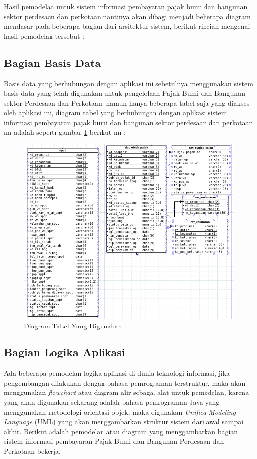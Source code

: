 \documentclass[pdftex,12pt, oneside]{article}
\begin{document}
Hasil pemodelan untuk sistem informasi pembayaran pajak bumi dan bangunan sektor perdesaan dan perkotaan nantinya akan dibagi menjadi beberapa diagram mendasar pada beberapa bagian dari arsitektur sistem, berikut rincian mengenai hasil pemodelan tersebut :

\subsection{Bagian Basis Data}

Basis data yang berhubungan dengan aplikasi ini sebetulnya menggunakan sistem basis data yang telah digunakan untuk pengelolaan Pajak Bumi dan Bangunan sektor Perdesaan dan Perkotaan, namun hanya beberapa tabel saja yang diakses oleh aplikasi ini, diagram tabel yang berhubungan dengan aplikasi sistem informasi pembayaran pajak bumi dan bangunan sektor perdesaan dan perkotaan ini adalah seperti gambar \ref{fig:db-dia} berikut ini :

\begin{figure}[H]
	\centering
	\includegraphics[width=1\textwidth]{./resources/db-diagram}
	\caption{Diagram Tabel Yang Digunakan}
	\label{fig:db-dia}
\end{figure}

\subsection{Bagian Logika Aplikasi}

Ada beberapa pemodelan logika aplikasi di dunia teknologi informasi, jika pengembangan dilakukan dengan bahasa pemrograman terstruktur, maka akan menggunakan \textit{flowchart} atau diagram alir sebagai alat untuk pemodelan, karena yang akan digunakan sekarang adalah bahasa pemrograman Java yang menggunakan metodologi orientasi objek, maka digunakan \textit{Unified Modeling Language} (UML) yang akan menggambarkan struktur sistem dari awal sampai akhir. Berikut adalah pemodelan atau diagram yang menggambarkan bagian sistem informasi pembayaran Pajak Bumi dan Bangunan Perdesaan dan Perkotaan bekerja.
\end{document}
